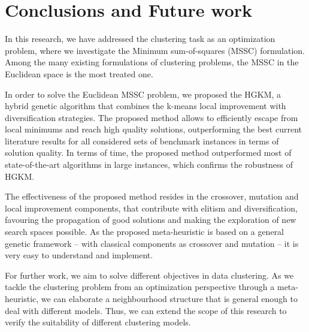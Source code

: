 \chapter{Conclusions and Future work}

In this research, we have addressed the clustering task as an optimization problem, where we investigate the Minimum sum-of-squares (MSSC) formulation. Among the many existing formulations of clustering problems, the MSSC in the Euclidean space is the most treated one.

In order to solve the Euclidean MSSC problem, we proposed the HGKM, a hybrid genetic algorithm that combines the k-means local improvement with diversification strategies. The proposed method allows to efficiently escape from local minimums and reach high quality solutions, outperforming the best current literature results for all considered sets of benchmark instances in terms of solution quality. In terms of time, the proposed method outperformed most of state-of-the-art algorithms in large instances, which confirms the robustness of HGKM.

The effectiveness of the proposed method resides in the crossover, mutation and local improvement components, that contribute with elitism and diversification, favouring the propagation of good solutions and making the exploration of new search spaces possible. As the proposed meta-heuristic is based on a general genetic framework -- with classical components as crossover and mutation -- it is very easy to understand and implement.

For further work, we aim to solve different objectives in data clustering. As we tackle the clustering problem from an optimization perspective through a meta-heuristic, we can elaborate a neighbourhood structure that is general enough to deal with different models. Thus, we can extend the scope of this research to verify the suitability of different clustering models.